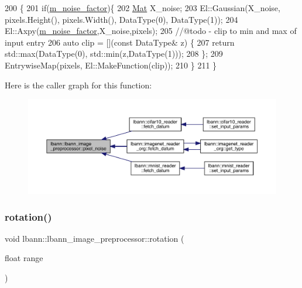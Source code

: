 \begin{DoxyCode}
200 \{
201   \textcolor{keywordflow}{if}(\hyperlink{classlbann_1_1lbann__image__preprocessor_af860c1d78af06e4ae94ad68e3032fe92}{m\_noise\_factor})\{
202     \hyperlink{base_8hpp_a68f11fdc31b62516cb310831bbe54d73}{Mat} X\_noise;
203     El::Gaussian(X\_noise, pixels.Height(), pixels.Width(), DataType(0), DataType(1));
204     El::Axpy(\hyperlink{classlbann_1_1lbann__image__preprocessor_af860c1d78af06e4ae94ad68e3032fe92}{m\_noise\_factor},X\_noise,pixels);
205     \textcolor{comment}{//@todo - clip to min and max of input entry}
206     \textcolor{keyword}{auto} clip = [](\textcolor{keyword}{const} DataType& z) \{ 
207          \textcolor{keywordflow}{return} std::max(DataType(0), std::min(z,DataType(1)));
208     \};
209     EntrywiseMap(pixels, El::MakeFunction(clip));
210   \} 
211 \}
\end{DoxyCode}
Here is the caller graph for this function\+:\nopagebreak
\begin{figure}[H]
\begin{center}
\leavevmode
\includegraphics[width=350pt]{classlbann_1_1lbann__image__preprocessor_aece5b572d0a2fe123cc66412d7a5c91e_icgraph}
\end{center}
\end{figure}
\mbox{\label{classlbann_1_1lbann__image__preprocessor_a1a293733368dd9eceba3e99cf9e5ae24}} 
\subsubsection{\texorpdfstring{rotation()}{rotation()}}
{\footnotesize\ttfamily void lbann\+::lbann\+\_\+image\+\_\+preprocessor\+::rotation (\begin{DoxyParamCaption}\item[{float}]{range }\end{DoxyParamCaption})\hspace{0.3cm}{\ttfamily [inline]}}

